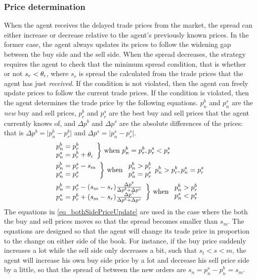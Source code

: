 \subsubsection{Price determination}
When the agent receives the delayed trade prices from the market, the spread can either increase or decrease relative to the agent's previously known prices. In the former case, the agent always updates its prices to follow the widening gap between the buy side and the sell side. When the spread decreases, the strategy requires the agent to check that the minimum spread condition, that is whether or not $s_{r} < \theta_{i}$, where $s_{r}$ is spread the calculated from the trade prices that the agent has just \textit{received}. If the condition is not violated, then the agent can freely update prices to follow the current trade prices. If the condition is violated, then the agent determines the trade price by the following equations. $p^b_n$ and $p^s_n$ are the \textit{new} buy and sell prices, $p^b_r$ and $p^s_r$ are the best buy and sell prices that the agent currently knows of, and $\Delta p^b$ and $\Delta p^s$ are the absolute differences of the prices:
 that is $\Delta p^b = \lvert p^b_n - p^b_r \rvert$ and $\Delta p^s = \lvert p^s_n - p^s_r \rvert$.
\begin{align}
& \begin{array}{l}
p^b_n = p^b_r\\
p^s_n = p^b_r + \theta_{i}
\end{array}
\bigg\}
\text{ when }
p^b_n = p^b_r, p^s_r < p^s_r
\\
& \begin{array}{l}
p^b_n = p^s_r - s_m\\
p^s_n = p^s_r
\end{array}
\bigg\}
\text{ when }
\begin{array}{l}
p^b_n > p^b_r\\
p^s_n = p^s_r
\end{array}
p^b_n > p^b_r,  p^s_n = p^s_r
\\
& \begin{array}{l}
p^b_n=p^s_r-(s_m-s_r)\frac{\Delta p^b}{\Delta p^b+\Delta p^s}\\
p^s_n=p^b_r+(s_m-s_r)\frac{\Delta p^s}{\Delta p^b+\Delta p^s}
\end{array}
\bigg\}\label{eq_bothSidePriceUpdate}
\text{ when }
\begin{array}{l}
p^b_n > p^b_r\\
p^s_n < p^s_r
\end{array}
\end{align}
The equations in \ref{eq_bothSidePriceUpdate} are used in the case where the both the buy and sell prices moves so that the spread becomes smaller than $s_m$. The equations are designed so that the agent will change its trade price in proportion to the change on either side of the book. For instance, if the buy price suddenly increases a lot while the sell side only decreases a bit, such that $s_t < s<m$, the agent will increase his own buy side price by a lot and decrease his sell price side by a little, so that the spread of between the new orders are $s_n = p^s_n - p^b_n = s_m$.

